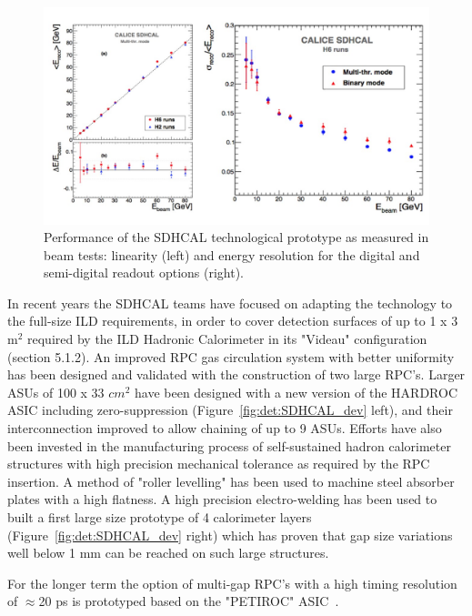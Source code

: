 \begin{figure}[t!]
\centering
\includegraphics[width=1.0\hsize]{Detector/fig/SDHCAL_performance.jpg}
\caption{Performance of the SDHCAL technological prototype as measured in beam tests: linearity (left) and energy resolution for the digital and semi-digital readout options (right).}
\label{fig:det:SDHCAL_perf}
\end{figure}

In recent years the SDHCAL teams have focused on adapting the technology to the full-size ILD requirements, in order to cover detection surfaces of up to 1 x 3 m$^2$ required by the ILD Hadronic Calorimeter in its "Videau" configuration (section 5.1.2). An improved RPC gas circulation system with better uniformity has been designed and validated with the construction of two large RPC's. Larger ASUs of 100 x 33 $cm^2$ have been designed with a new version of the HARDROC ASIC including zero-suppression (Figure~\ref{fig:det:SDHCAL_dev} left), and their interconnection improved to allow chaining of up to 9 ASUs. Efforts have also been invested in the manufacturing process of self-sustained hadron calorimeter structures with high precision mechanical tolerance as required by the RPC insertion. A method of "roller levelling" has been used to machine steel absorber plates with a high flatness. A high precision electro-welding has been used to built a first large size prototype of 4 calorimeter layers (Figure~\ref{fig:det:SDHCAL_dev} right) which has proven that gap size variations well below 1 mm can be reached on such large structures. 

For the longer term the option of multi-gap RPC's with a high timing resolution of $\approx$20 ps is prototyped based on the "PETIROC" ASIC~\cite{Fleury:2014hfa}. 


